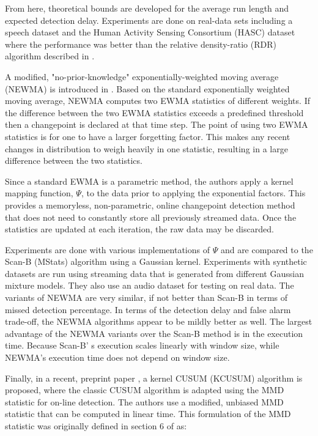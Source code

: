 From here, theoretical bounds are developed for the average run length and expected detection delay. Experiments are done on real-data sets including a speech dataset  and the Human Activity Sensing Consortium (HASC) dataset where the performance was better than the relative density-ratio (RDR) algorithm described in \cite{liu2013change}.


A modified, "no-prior-knowledge" exponentially-weighted moving average (NEWMA) is introduced in \cite{keriven2018newma}. Based on the standard exponentially weighted moving average, NEWMA computes two EWMA statistics of different weights. If the difference between the two EWMA statistics exceeds a predefined threshold then a changepoint is declared at that time step. The point of using two EWMA statistics is for one to have a larger forgetting factor. This makes any recent changes in distribution to weigh heavily in one statistic, resulting in a large difference between the two statistics. 

Since a standard EWMA is a parametric method, the authors apply a kernel mapping function, $\Psi$, to the data prior to applying the exponential factors. This provides a memoryless, non-parametric, online changepoint detection method that does not need to constantly store all previously streamed data. Once the statistics are updated at each iteration, the raw data may be discarded. 

Experiments are done with various implementations of $\Psi$ and are compared to the Scan-B (MStats) algorithm using a Gaussian kernel. Experiments with synthetic datasets are run using streaming data that is generated from different Gaussian mixture models. They also use an audio dataset for testing on real data. The variants of NEWMA are very similar, if not better than Scan-B in terms of missed detection percentage. In terms of the detection delay and false alarm trade-off, the NEWMA algorithms appear to be mildly better as well. The largest advantage of the NEWMA variants over the Scan-B method is in the execution time. Because Scan-B' s execution scales linearly with window size, while NEWMA's execution time does not depend on window size.

Finally, in a recent, preprint paper \cite{flynn2019change}, a kernel CUSUM (KCUSUM) algorithm is proposed, where the classic CUSUM algorithm is adapted using the MMD statistic for on-line detection. The authors use a modified, unbiased MMD statistic that can be computed in linear time. This formulation of the MMD statistic was originally defined in section 6 of \cite{gretton2012kernel} as:

